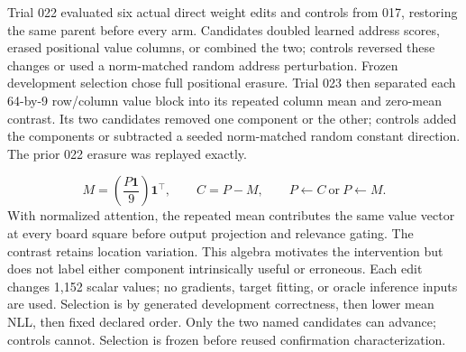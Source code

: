\documentclass[11pt]{article}
\begin{document}
Trial 022 evaluated six actual direct weight edits and controls from 017, restoring the same parent before every arm. Candidates doubled learned address scores, erased positional value columns, or combined the two; controls reversed these changes or used a norm-matched random address perturbation. Frozen development selection chose full positional erasure. Trial 023 then separated each 64-by-9 row/column value block into its repeated column mean and zero-mean contrast. Its two candidates removed one component or the other; controls added the components or subtracted a seeded norm-matched random constant direction. The prior 022 erasure was replayed exactly.

\[M=\left(\frac{P\mathbf 1}{9}\right)\mathbf 1^\top,\qquad C=P-M,\qquad P\leftarrow C\ \text{or}\ P\leftarrow M.\]
With normalized attention, the repeated mean contributes the same value vector at every board square before output projection and relevance gating. The contrast retains location variation. This algebra motivates the intervention but does not label either component intrinsically useful or erroneous. Each edit changes 1,152 scalar values; no gradients, target fitting, or oracle inference inputs are used. Selection is by generated development correctness, then lower mean NLL, then fixed declared order. Only the two named candidates can advance; controls cannot. Selection is frozen before reused confirmation characterization.
\end{document}

